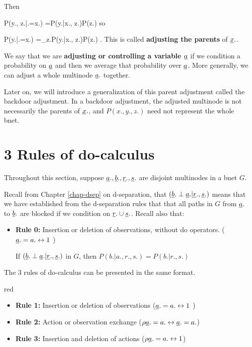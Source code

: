 Then

\beq
P(y., z.|\rho \rvx.=x.)
=P(y.|x., z.)P(z.)
\eeq
so

\beq
P(y.|\rho \rvx.=x.)
=\sum_{z.}P(y.|x., z.)P(z.)
\;.
\eeq
This is called
{\bf adjusting the parents}
of ${\underline{x}}.$.


We say that 
we are {\bf adjusting 
or controlling a variable ${\underline{a}}$}
if we condition 
a probability on ${\underline{a}}$ and 
then we average 
that probability over ${\underline{a}}$.
More generally, 
we can adjust a whole
multinode ${\underline{a}}.$ together.

Later on,
we will introduce 
a generalization
of 
this parent adjustment
called the 
backdoor adjustment.
In a backdoor adjustment,
the adjusted multinode
is not necessarily
 the parents of ${\underline{x}}.$, 
and $P(x., y., z.)$
need not represent the
whole bnet.



\section*{3 Rules of do-calculus}
Throughout 
this section, suppose
${\underline{a}}., {\underline{b}}., {\underline{r}}., 
{\underline{s}}.$ are disjoint
multinodes in a bnet $G$.


Recall
from Chapter \ref{chap-dsep}
on d-separation,
that  $({\underline{b}}.\perp {\underline{a}}.|{\underline{r}}., {\underline{s}}.)$
means that 
we have established
from the d-separation
rules that 
that all 
paths in $G$
 from
${\underline{a}}.$ to
${\underline{b}}.$
are blocked
if we condition
on ${\underline{r}}.\cup {\underline{s}}.$.
Recall also that:

\begin{itemize}
\item {\bf Rule 0:} Insertion or
 deletion of
 observations, without
do operators.
(${\underline{a}}.=a. \leftrightarrow 1$ )


If 
 $({\underline{b}}.\perp {\underline{a}}.|{\underline{r}}., 
{\underline{s}}.)$ in $G$, then 
$P(b.|a., r., s.)=P(b.|r., s.)$
\end{itemize}

The 3 rules of do-calculus
can be presented in the same
format. 


\begin{color}{red}
\begin{itemize}
\item {\bf Rule 1:} 
Insertion or deletion of
 observations 
(${\underline{a}}.=a. \leftrightarrow 1$ )


\item {\bf Rule 2:} Action or 
observation exchange 
($\rho {\underline{a}}.=a. \leftrightarrow {\underline{a}}.=a.$)


\item {\bf Rule 3:} Insertion and
 deletion of actions
($\rho {\underline{a}}.=a. \leftrightarrow 1$)



\end{itemize}
\end{color}

